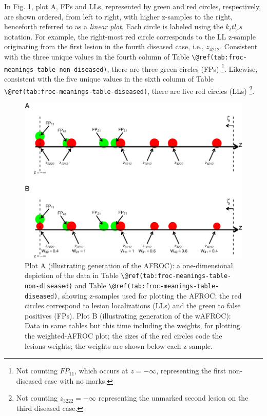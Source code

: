 \documentclass[
]{book}
\begin{document}
In Fig. \ref{fig:froc-meanings-linear-plot-afroc-wafroc}, plot A, FPs and LLs, represented by green and red circles, respectively, are shown ordered, from left to right, with higher z-samples to the right, henceforth referred to as a \emph{linear plot}. Each circle is labeled using the \(k_t t l_s s\) notation. For example, the right-most red circle corresponds to the LL z-sample originating from the first lesion in the fourth diseased case, i.e., \(z_{4212}\). Consistent with the three unique values in the fourth column of Table \texttt{\textbackslash{}@ref(tab:froc-meanings-table-non-diseased)}, there are three green circles (FPs) \footnote{Not counting \(FP_{11}\), which occurs at \(z = -\infty\), representing the first non-diseased case with no marks.}. Likewise, consistent with the five unique values in the sixth column of Table \texttt{\textbackslash{}@ref(tab:froc-meanings-table-diseased)}, there are five red circles (LLs) \footnote{Not counting \(z_{3222} = -\infty\) representing the unmarked second lesion on the third diseased case.}.

\begin{figure}
\centering
\includegraphics{14-meanings-foms_files/figure-latex/froc-meanings-linear-plot-afroc-wafroc-1.pdf}
\caption{\label{fig:froc-meanings-linear-plot-afroc-wafroc}Plot A (illustrating generation of the AFROC): a one-dimensional depiction of the data in Table \texttt{\textbackslash{}@ref(tab:froc-meanings-table-non-diseased)} and Table \texttt{\textbackslash{}@ref(tab:froc-meanings-table-diseased)}, showing z-samples used for plotting the AFROC; the red circles correspond to lesion localizations (LLs) and the green to false positives (FPs). Plot B (illustrating generation of the wAFROC): Data in same tables but this time including the weights, for plotting the weighted-AFROC plot; the sizes of the red circles code the lesions weights; the weights are shown below each z-sample.}
\end{figure}
\end{document}

